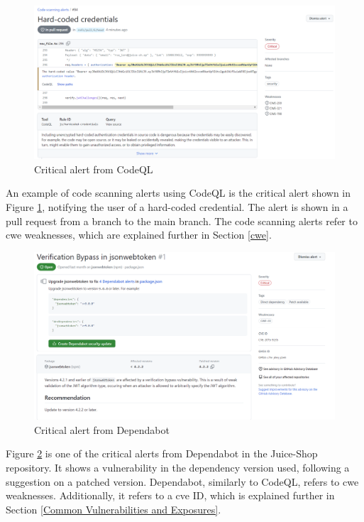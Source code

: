 \vspace{2mm}
\begin{figure}[H]
    \centering
    \includegraphics[width=0.8\columnwidth]{Images/codescan.png}
    \caption{Critical alert from CodeQL}
    \label{fig: Critical alert CodeQL}
\end{figure}

An example of code scanning alerts using CodeQL is the critical alert shown in Figure \ref{fig: Critical alert CodeQL}, notifying the user of a hard-coded credential. The alert is shown in a pull request from a branch to the main branch. The code scanning alerts refer to \acrshort{cwe} weaknesses, which are explained further in Section \ref{cwe}.

\vspace{2mm}
\begin{figure}[H]
    \centering
    \includegraphics[width=0.8\columnwidth]{Images/dependabotalert.png}
    \caption{Critical alert from Dependabot}
    \label{fig: Critical alert from Dependabot}
\end{figure}

Figure \ref{fig: Critical alert from Dependabot} is one of the critical alerts from Dependabot in the Juice-Shop repository. It shows a vulnerability in the dependency version used, following a suggestion on a patched version. Dependabot, similarly to CodeQL, refers to \acrshort{cwe} weaknesses. Additionally, it refers to a \acrshort{cve} ID, which is explained further in Section \ref{Common Vulnerabilities and Exposures}.

